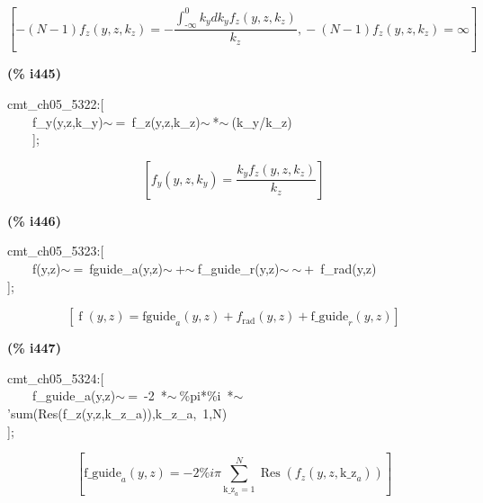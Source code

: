 \documentclass[fleqn]{article}
\begin{document}
\[\tag{\% o444} 
\left[ -\left( N-1\right)  {f_z}\left( y\operatorname{,}z\operatorname{,}{k_z}\right) =-\frac{\int_{\operatorname{-}\infty }^{0}{\left. {k_y}d{k_y}\right.} {f_z}\left( y\operatorname{,}z\operatorname{,}{k_z}\right) }{{k_z}}\operatorname{,}-\left( N-1\right)  {f_z}\left( y\operatorname{,}z\operatorname{,}{k_z}\right) =\infty \right] \mbox{}
\]


\noindent
\begin{minipage}[t]{4.000000em}\color{red}\bfseries
(\% i445)	
\end{minipage}
\begin{minipage}[t]{\textwidth}\color{blue}
cmt\_ch05\_5322:[\\
\ \ \ \ f\_y(y,z,k\_y)\ensuremath{\sim\ }=\ f\_z(y,z,k\_z)\ensuremath{\sim\ }*\ensuremath{\sim\ }(k\_y/k\_z)\\
\ \ \ \ ];
\end{minipage}
\[\displaystyle \tag{\% o445} 
\left[ {f_y}\left( y\operatorname{,}z\operatorname{,}{k_y}\right) =\frac{{k_y} {f_z}\left( y\operatorname{,}z\operatorname{,}{k_z}\right) }{{k_z}}\right] \mbox{}
\]


\noindent
\begin{minipage}[t]{4.000000em}\color{red}\bfseries
(\% i446)	
\end{minipage}
\begin{minipage}[t]{\textwidth}\color{blue}
cmt\_ch05\_5323:[\\
\ \ \ \ f(y,z)\ensuremath{\sim\ }=\ fguide\_a(y,z)\ensuremath{\sim\ }+\ensuremath{\sim\ }f\_guide\_r(y,z)\ensuremath{\sim\ }\ensuremath{\sim\ }+\ f\_rad(y,z)\\
];
\end{minipage}
\[\displaystyle \tag{\% o446} 
\left[ \operatorname{f}\left( y\operatorname{,}z\right) ={{\ensuremath{\mathrm{fguide}}}_a}\left( y\operatorname{,}z\right) +{f_{\ensuremath{\mathrm{rad}}}}\left( y\operatorname{,}z\right) +{{\ensuremath{\mathrm{f\_ guide}}}_r}\left( y\operatorname{,}z\right) \right] \mbox{}
\]


\noindent
\begin{minipage}[t]{4.000000em}\color{red}\bfseries
(\% i447)	
\end{minipage}
\begin{minipage}[t]{\textwidth}\color{blue}
cmt\_ch05\_5324:[\\
\ \ \ \ f\_guide\_a(y,z)\ensuremath{\sim\ }=\ -2\ *\ensuremath{\sim\ }\%pi*\%i\ *\ensuremath{\sim\ }'sum(Res(f\_z(y,z,k\_z\_a)),k\_z\_a,\ 1,N)\\
];
\end{minipage}
\[\displaystyle \tag{\% o447} 
\left[ {{\ensuremath{\mathrm{f\_ guide}}}_a}\left( y\operatorname{,}z\right) =-2 \% i \ensuremath{\pi}  \sum_{{{\ensuremath{\mathrm{k\_ z}}}_a}=1}^{N}{\left. \operatorname{Res}\left( {f_z}\left( y\operatorname{,}z\operatorname{,}{{\ensuremath{\mathrm{k\_ z}}}_a}\right) \right) \right.}\right] \mbox{}
\]
\end{document}
